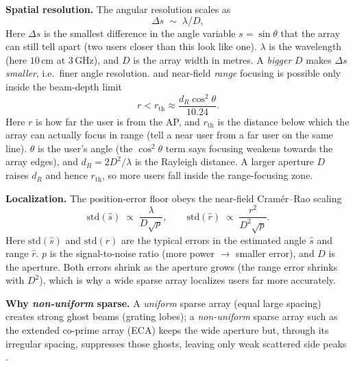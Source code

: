 \documentclass[11pt]{article}
\begin{document}
\noindent\textbf{Spatial resolution.} The angular resolution scales as
\begin{equation}
\Delta s \;\sim\; \lambda/D,
\label{eq:angres}
\end{equation}
%
{Here $\Delta s$ is the smallest difference in the angle variable $s=\sin\theta$ that the array can
still tell apart (two users closer than this look like one). $\lambda$ is the wavelength (here
$10$\,cm at $3$\,GHz), and $D$ is the array width in metres. A \emph{bigger} $D$ makes $\Delta s$
\emph{smaller}, i.e.\ finer angle resolution.}
and near-field \emph{range} focusing is possible only inside the beam-depth limit
\cite[Prop.~2]{zhou2025sparse}
\begin{equation}
r < r_{\mathrm{th}} \approx \frac{d_{R}\cos^{2}\theta}{10.24}.
\label{eq:depth}
\end{equation}
%
{Here $r$ is how far the user is from the AP, and $r_{\mathrm{th}}$ is the distance below which the
array can actually focus in range (tell a near user from a far user on the same line). $\theta$ is
the user's angle (the $\cos^{2}\theta$ term says focusing weakens towards the array edges), and
$d_{R}=2D^{2}/\lambda$ is the Rayleigh distance. A larger aperture $D$ raises $d_R$ and hence
$r_{\mathrm{th}}$, so more users fall inside the range-focusing zone.}

\noindent\textbf{Localization.} The position-error floor obeys the near-field Cram\'er--Rao scaling
\cite{lu2024tutorial,kosasih2025mla}
\begin{equation}
\mathrm{std}(\hat{s})\;\propto\;\frac{\lambda}{D\sqrt{p}},\qquad
\mathrm{std}(\hat{r})\;\propto\;\frac{r^{2}}{D^{2}\sqrt{p}}.
\label{eq:crb}
\end{equation}
%
{Here $\mathrm{std}(\hat{s})$ and $\mathrm{std}(\hat{r})$ are the typical errors in the estimated
angle $\hat s$ and range $\hat r$. $p$ is the signal-to-noise ratio (more power $\to$ smaller error),
and $D$ is the aperture. Both errors shrink as the aperture grows (the range error shrinks with
$D^{2}$), which is why a wide sparse array localizes users far more accurately.}

\noindent\textbf{Why \emph{non-uniform} sparse.} A \emph{uniform} sparse array (equal large spacing)
creates strong ghost beams (grating lobes); a \emph{non-uniform} sparse array such as the extended
co-prime array (ECA) keeps the wide aperture but, through its irregular spacing, suppresses those
ghosts, leaving only weak scattered side peaks \cite{zhou2025sparse,vaidyanathan2011coprime}.
\end{document}
